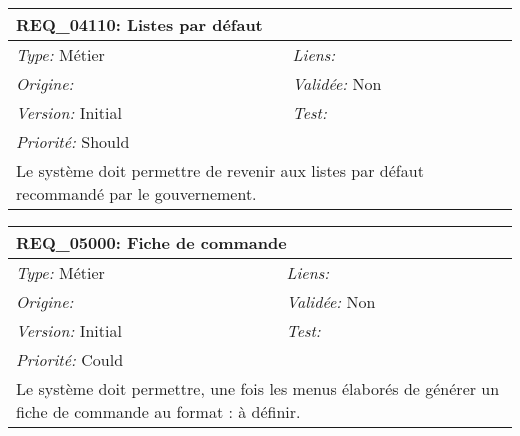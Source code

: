 \begin{table}[!h]

\begin{tabular}{|p{60mm}p{100mm}|}

\hline

\multicolumn{2}{|l|}{\textbf{REQ\_04110:} Listes par défaut} \\ \hline

\emph{Type:} Métier & \emph{Liens:}  \\

\emph{Origine:}  & \emph{Validée:} Non \\

\emph{Version:} Initial & \emph{Test:}  \\

\emph{Priorité:} Should & \\ \hline

\multicolumn{2}{|p{16cm}|}{Le système doit permettre de revenir aux listes par défaut recommandé par le gouvernement.} \\ \hline

\end{tabular}

\end{table}



\begin{table}[!h]

\begin{tabular}{|p{60mm}p{100mm}|}

\hline

\multicolumn{2}{|l|}{\textbf{REQ\_05000:} Fiche de commande} \\ \hline

\emph{Type:} Métier & \emph{Liens:}  \\

\emph{Origine:}  & \emph{Validée:} Non \\

\emph{Version:} Initial & \emph{Test:}  \\

\emph{Priorité:} Could & \\ \hline

\multicolumn{2}{|p{16cm}|}{Le système doit permettre, une fois les menus élaborés de générer un fiche de commande au format : à définir.} \\ \hline

\end{tabular}

\end{table}



